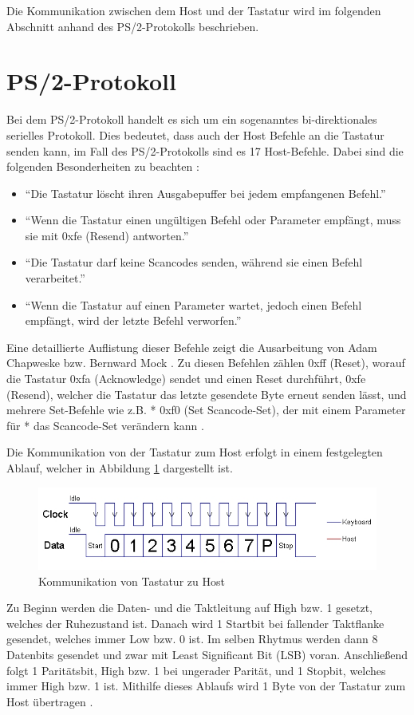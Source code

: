 Die Kommunikation zwischen dem Host und der Tastatur wird im folgenden Abschnitt anhand des PS/2-Protokolls beschrieben.



\section{PS/2-Protokoll}
Bei dem PS/2-Protokoll handelt es sich um ein sogenanntes bi-direktionales serielles Protokoll. Dies bedeutet, dass auch der Host Befehle an die Tastatur senden kann, im Fall des PS/2-Protokolls sind es 17 Host-Befehle. Dabei sind die folgenden Besonderheiten zu beachten \cite{chapweske} \cite{mock}:
\begin{itemize}
  \item ``Die Tastatur löscht ihren Ausgabepuffer bei jedem empfangenen Befehl.''
  \item ``Wenn die Tastatur einen ungültigen Befehl oder Parameter empfängt, muss sie mit 0xfe (Resend) antworten.''
  \item ``Die Tastatur darf keine Scancodes senden, während sie einen Befehl verarbeitet.''
  \item ``Wenn die Tastatur auf einen Parameter wartet, jedoch einen Befehl empfängt, wird der letzte Befehl verworfen.''
\end{itemize}
Eine detaillierte Auflistung dieser Befehle zeigt die Ausarbeitung von Adam Chapweske \cite{chapweske} bzw. Bernward Mock \cite{mock}. Zu diesen Befehlen zählen 0xff (Reset), worauf die Tastatur 0xfa (Acknowledge) sendet und einen Reset durchführt, 0xfe (Resend), welcher die Tastatur das letzte gesendete Byte erneut senden lässt, und mehrere Set-Befehle wie z.B. * 0xf0 (Set Scancode-Set), der mit einem Parameter für * das Scancode-Set verändern kann \cite{chapweske} \cite{mock}.

Die Kommunikation von der Tastatur zum Host erfolgt in einem festgelegten Ablauf, welcher in Abbildung \ref{device_to_host} \cite{device_to_host} dargestellt ist.
\begin{figure}
  \centering
  \includegraphics[width=1\textwidth]{images/device_to_host.jpg}
  \caption{Kommunikation von Tastatur zu Host}
  \label{device_to_host}
\end{figure}
Zu Beginn werden die Daten- und die Taktleitung auf High bzw. 1 gesetzt, welches der Ruhezustand ist. Danach wird 1 Startbit bei fallender Taktflanke gesendet, welches immer Low bzw. 0 ist. Im selben Rhytmus werden dann 8 Datenbits gesendet und zwar mit Least Significant Bit (LSB) voran. Anschließend folgt 1 Paritätsbit, High bzw. 1 bei ungerader Parität, und 1 Stopbit, welches immer High bzw. 1 ist. Mithilfe dieses Ablaufs wird 1 Byte von der Tastatur zum Host übertragen \cite{chapweske} \cite{mock}.

